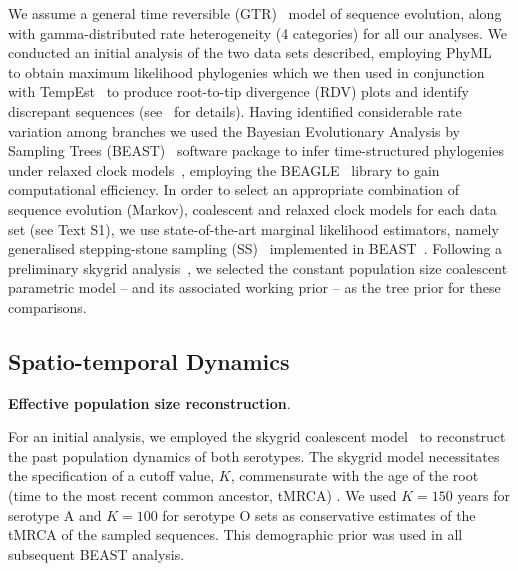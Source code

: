 \documentclass[10pt]{article}
\begin{document}
We assume a general time reversible (GTR)~\citep{Tavare1986} model of sequence evolution, along with gamma-distributed rate heterogeneity (4 categories) for all our analyses.
We conducted an initial analysis of the two data sets described, employing PhyML~\citep{Guindon2003} to obtain maximum likelihood phylogenies which we then used in conjunction with TempEst~\citep{Rambaut2016} to produce root-to-tip divergence (RDV) plots and identify discrepant sequences (see~\cite{Rambaut2016} for details).
Having identified considerable rate variation among branches we used the Bayesian Evolutionary Analysis by Sampling Trees (BEAST)~\citep{Suchard2018} software package to infer time-structured phylogenies under relaxed clock models~\citep{Drummond2006}, employing the BEAGLE~\citep{Ayres2012,Ayres2019} library to gain computational efficiency. %
In order to select an appropriate combination of sequence evolution (Markov), coalescent and relaxed clock models for each data set (see Text S1), we use state-of-the-art marginal likelihood estimators, namely generalised stepping-stone sampling (SS)~\citep{Baele2016} %
implemented in BEAST~\citep{Suchard2018}.
Following a preliminary skygrid analysis~\citep{Gill2013}, we selected the constant population size coalescent parametric model -- and its associated working prior -- as the tree prior for these comparisons.

\subsection*{Spatio-temporal Dynamics}

\textbf{Effective population size reconstruction}.

For an initial analysis, we employed the skygrid coalescent model~\citep{Gill2013,Hill2019} %
 to reconstruct the past population dynamics of both serotypes.
The skygrid model necessitates the specification of a cutoff value, $K$, commensurate with the age of the root (time to the most recent common ancestor, tMRCA) .
We used $K = 150$ years for serotype A and $K = 100$ for serotype O sets as conservative estimates of the tMRCA of the sampled sequences. 
This demographic prior was used in all subsequent BEAST analysis.
\end{document}
